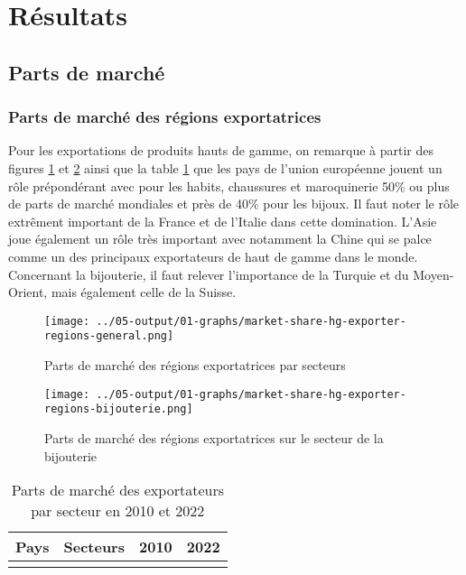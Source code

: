\documentclass[french,10pt,a4paper]{article}
\begin{document}
\section{Résultats}

\subsection{Parts de marché}

\subsubsection{Parts de marché des régions exportatrices}

Pour les exportations de produits hauts de gamme, on remarque à partir des figures \ref{fig:market-share-hg-exporter-regions-general} et \ref{fig:market-share-hg-exporter-regions-bijouterie} ainsi que la table \ref{tab:market-share-country-exporter} que les pays de l'union européenne jouent un rôle prépondérant avec pour les habits, chaussures et maroquinerie 50\% ou plus de parts de marché mondiales et près de 40\% pour les bijoux. Il faut noter le rôle extrêment important de la France et de l'Italie dans cette domination. L'Asie joue également un rôle très important avec notamment la Chine qui se palce comme un des principaux exportateurs de haut de gamme dans le monde. Concernant la bijouterie, il faut relever l'importance de la Turquie et du Moyen-Orient, mais également celle de la Suisse. 

\begin{figure}[!h]
  \centering \texttt{[image: ../05-output/01-graphs/market-share-hg-exporter-regions-general.png]}
  \caption{Parts de marché des régions exportatrices par secteurs}
  \label{fig:market-share-hg-exporter-regions-general}
\end{figure}

\begin{figure}[!h]
  \centering \texttt{[image: ../05-output/01-graphs/market-share-hg-exporter-regions-bijouterie.png]}
  \caption{Parts de marché des régions exportatrices sur le secteur de la bijouterie}
  \label{fig:market-share-hg-exporter-regions-bijouterie}
\end{figure}

\begin{table}[ht]
  \centering
  \begin{tabular}{lrrr}
    \hline
   Pays & Secteurs & 2010 & 2022 \\
    \hline
    \\
    \hline
  \end{tabular}
  \caption{Parts de marché des exportateurs par secteur en 2010 et 2022}
  \label{tab:market-share-country-exporter}
\end{table}
\end{document}
